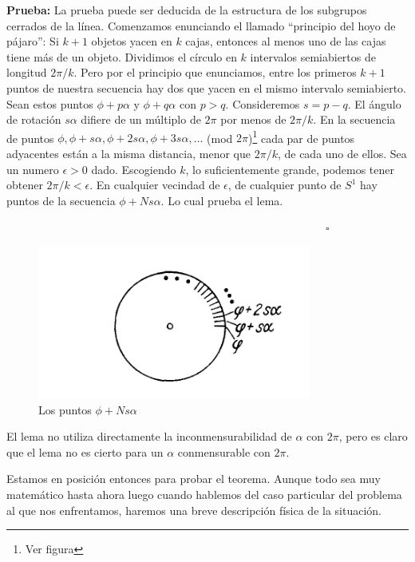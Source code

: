 \documentclass[a4paper,10pt]{article}
\numberwithin{equation}{section}
\newcommand{\prueba}{\textbf{Prueba: }}
\begin{document}
\prueba La prueba puede ser deducida de la estructura de los subgrupos cerrados 
de la línea. Comenzamos enunciando el llamado ``principio del hoyo de pájaro'': Si $k+1$ 
objetos yacen en $k$ cajas, entonces al menos uno de las cajas tiene más de un 
objeto. Dividimos el círculo en $k$ intervalos semiabiertos de longitud $2\pi/k$. 
Pero por el principio que enunciamos, entre los primeros $k+1$ puntos de nuestra 
secuencia hay dos que yacen en el mismo intervalo semiabierto. Sean estos puntos 
$\phi+p\alpha$ y $\phi+q\alpha$ con $p>q$. Consideremos $s=p-q$. El ángulo de 
rotación $s\alpha$ difiere de un múltiplo de $2\pi$ por menos de $2\pi/k$. En la secuencia 
de puntos $\phi,\phi+s\alpha,\phi+2s\alpha,\phi+3s\alpha,\dots$ (mod $2\pi$)\footnote{Ver figura 
} cada par de puntos adyacentes están a la misma distancia, menor que $2\pi/k$, de cada uno de 
ellos. Sea un numero $\epsilon>0$ dado. Escogiendo $k$, lo suficientemente grande,
podemos tener obtener $2\pi/k < \epsilon$. En cualquier vecindad de $\epsilon$, de 
cualquier punto de $S^1$ hay puntos de la secuencia $\phi+Ns\alpha$. Lo cual prueba
el lema.

\vspace{.2cm} $\hspace{12cm} \square$

\begin{figure}[H]
 \center
 \includegraphics[scale=0.6]{problema2fig1}
 \caption{Los puntos $\phi+Ns\alpha$}
 \label{fig:problema2fig1}
\end{figure}


El lema no utiliza directamente la inconmensurabilidad de $\alpha$ con $2\pi$, pero 
es claro que el lema no es cierto para un $\alpha$ conmensurable con $2\pi$.

\vspace{.3cm}

Estamos en posición entonces para probar el teorema. Aunque todo sea muy matemático 
hasta ahora luego cuando hablemos del caso particular del problema al que nos enfrentamos,
haremos una breve descripción física de la situación.
\end{document}
